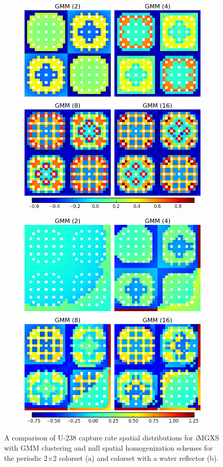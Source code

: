 \documentclass[12pt,twoside]{mitthesis-exec}
\begin{document}
\begin{figure}[h!]
\centering
\begin{subfigure}{0.9\textwidth}
  \centering
\includegraphics[width=0.6\linewidth]{figures/results/compare/2x2/compare-capt}
  \caption{}
  \label{fig:refl-capt-rates-comp-refl}
\end{subfigure}
\par\bigskip
\begin{subfigure}{0.9\textwidth}
  \centering
\includegraphics[width=0.6\linewidth]{figures/results/compare/reflector/compare-capt}
  \caption{}
  \label{fig:refl-capt-rates-comp-2x2}
\end{subfigure}
\caption[U-238 capture rate comparison for the colorset]{A comparison of U-238 capture rate spatial distributions for \textit{i}MGXS with GMM clustering and null spatial homogenization schemes for the periodic 2$\times$2 colorset (a) and colorset with a water reflector (b).}
\label{fig:refl-capt-rates-comp}
\end{figure}
\end{document}
